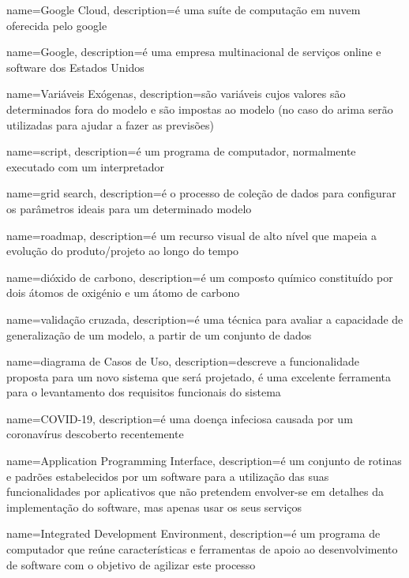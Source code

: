 {
    name={Google Cloud},
    description={é uma suíte de computação em nuvem oferecida pelo \gls{google}}
}

{
    name={Google},
    description={é uma empresa multinacional de serviços online e software dos
    Estados Unidos}
}

{
    name={Variáveis Exógenas},
    description={são variáveis cujos valores são determinados fora do modelo e são
    impostas ao modelo (no caso do \acrshort{arima} serão utilizadas para ajudar a fazer
    as previsões)}
}

{
    name={script},
    description={é um programa de computador, normalmente executado com um interpretador}
}

{
    name={grid search},
    description={é o processo de coleção de dados para configurar os parâmetros ideais para
    um determinado modelo}
}

{
    name={roadmap},
    description={é um recurso visual de alto nível que mapeia a evolução do produto/projeto
    ao longo do tempo}
}

{
    name={dióxido de carbono},
    description={é um composto químico constituído por dois átomos de oxigénio e um átomo
    de carbono}
}

{
    name={validação cruzada},
    description={é uma técnica para avaliar a capacidade de generalização de um modelo, a
    partir de um conjunto de dados}
}

{
    name={diagrama de Casos de Uso},
    description={descreve a funcionalidade proposta para um novo sistema que será projetado,
    é uma excelente ferramenta para o levantamento dos requisitos funcionais do sistema}
}

{
    name={COVID-19},
    description={é uma doença infeciosa causada por um coronavírus descoberto recentemente}
}

{
    name={Application Programming Interface},
    description={é um conjunto de rotinas e padrões estabelecidos por um software para a
    utilização das suas funcionalidades por aplicativos que não pretendem envolver-se em
    detalhes da implementação do software, mas apenas usar os seus serviços}
}

{
    name={Integrated Development Environment},
    description={é um programa de computador que reúne características e ferramentas de
    apoio ao desenvolvimento de software com o objetivo de agilizar este processo}
}
